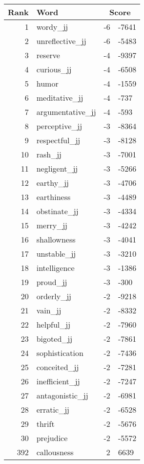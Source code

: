 \begin{longtable}[!htbp]{| rlr@{.}l |}
    \hline
    \textbf{Rank} & \textbf{Word} & \multicolumn{2}{c|}{\textbf{Score}} \\
    \hline
    \endhead
    1 & wordy\_jj & -6 & -7641 \\
    2 & unreflective\_jj & -6 & -5483 \\
    3 & reserve & -4 & -9397 \\
    4 & curious\_jj & -4 & -6508 \\
    5 & humor & -4 & -1559 \\
    6 & meditative\_jj & -4 & -737 \\
    7 & argumentative\_jj & -4 & -593 \\
    8 & perceptive\_jj & -3 & -8364 \\
    9 & respectful\_jj & -3 & -8128 \\
    10 & rash\_jj & -3 & -7001 \\
    11 & negligent\_jj & -3 & -5266 \\
    12 & earthy\_jj & -3 & -4706 \\
    13 & earthiness & -3 & -4489 \\
    14 & obstinate\_jj & -3 & -4334 \\
    15 & merry\_jj & -3 & -4242 \\
    16 & shallowness & -3 & -4041 \\
    17 & unstable\_jj & -3 & -3210 \\
    18 & intelligence & -3 & -1386 \\
    19 & proud\_jj & -3 & -300 \\
    20 & orderly\_jj & -2 & -9218 \\
    21 & vain\_jj & -2 & -8332 \\
    22 & helpful\_jj & -2 & -7960 \\
    23 & bigoted\_jj & -2 & -7861 \\
    24 & sophistication & -2 & -7436 \\
    25 & conceited\_jj & -2 & -7281 \\
    26 & inefficient\_jj & -2 & -7247 \\
    27 & antagonistic\_jj & -2 & -6981 \\
    28 & erratic\_jj & -2 & -6528 \\
    29 & thrift & -2 & -5676 \\
    30 & prejudice & -2 & -5572 \\
    392 & callousness & 2 & 6639 \\

\end{longtable}
